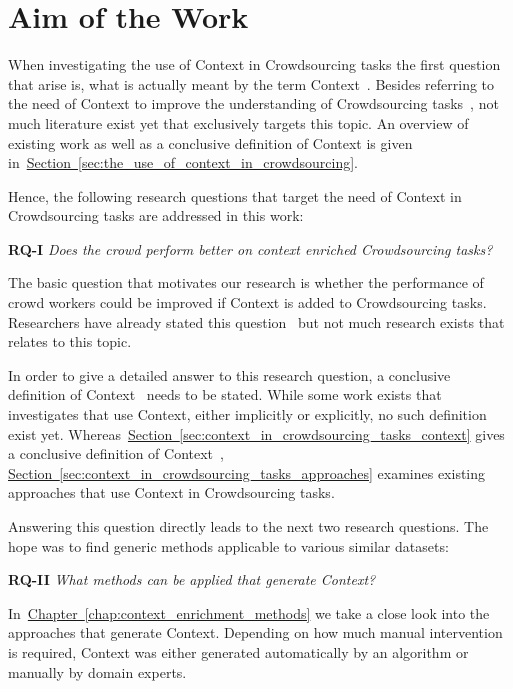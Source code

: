 \section{Aim of the Work}
When investigating the use of Context in Crowdsourcing tasks the first question that arise is, what is actually
meant by the term \guillemotright Context\guillemotleft~. Besides referring to the need of Context to improve the understanding
of Crowdsourcing tasks~\cite{sarasua2015crowdsourcing}, not much literature exist yet that exclusively targets this topic. An overview
of existing work as well as a conclusive definition of Context is given in~\hyperref[sec:the_use_of_context_in_crowdsourcing]{Section~\ref*{sec:the_use_of_context_in_crowdsourcing}}.

Hence, the following research questions that target the need of Context in Crowdsourcing tasks are addressed in this work:

\textbf{RQ-I} \emph{Does the crowd perform better on context enriched Crowdsourcing tasks?}

The basic question that motivates our research is whether the performance of crowd workers could be improved if Context is added
to Crowdsourcing tasks. Researchers have already stated this question~\cite{sarasua2015crowdsourcing} but not much research exists that relates to this topic. 

In order to give a detailed answer to this research question, a conclusive definition of \guillemotright Context\guillemotleft~ needs to be stated. While some work exists that investigates that use Context, either implicitly or explicitly, no such definition exist yet. Whereas~\hyperref[sec:context_in_crowdsourcing_tasks_context]{Section~\ref*{sec:context_in_crowdsourcing_tasks_context}} gives a conclusive definition of \guillemotright Context\guillemotleft~, \hyperref[sec:context_in_crowdsourcing_tasks_approaches]{Section~\ref*{sec:context_in_crowdsourcing_tasks_approaches}} examines existing approaches that use Context in Crowdsourcing tasks. 

Answering this question directly leads to the next two research questions. The hope was to find generic methods applicable to various similar
datasets:

\textbf{RQ-II} \emph{What methods can be applied that generate Context?}

In~\hyperref[chap:context_enrichment_methods]{Chapter~\ref*{chap:context_enrichment_methods}} we take a close look into the approaches that generate Context. Depending on how much manual intervention is required, Context was either generated automatically by an algorithm or manually by domain experts. 

